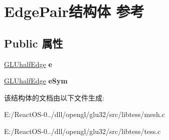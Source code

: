 \hypertarget{struct_edge_pair}{}\section{Edge\+Pair结构体 参考}
\label{struct_edge_pair}
\subsection*{Public 属性}
\begin{DoxyCompactItemize}
\item 
\mbox{\label{struct_edge_pair_a9ec0c37c680e543366b823bb6363ad46}} 
\hyperlink{struct_g_l_uhalf_edge}{G\+L\+Uhalf\+Edge} {\bfseries e}
\item 
\mbox{\label{struct_edge_pair_a5ddd94c16d662ff8d2e0962c5a82770f}} 
\hyperlink{struct_g_l_uhalf_edge}{G\+L\+Uhalf\+Edge} {\bfseries e\+Sym}
\end{DoxyCompactItemize}


该结构体的文档由以下文件生成\+:\begin{DoxyCompactItemize}
\item 
E\+:/\+React\+O\+S-\/0../dll/opengl/glu32/src/libtess/mesh.\+c\item 
E\+:/\+React\+O\+S-\/0../dll/opengl/glu32/src/libtess/tess.\+c\end{DoxyCompactItemize}
